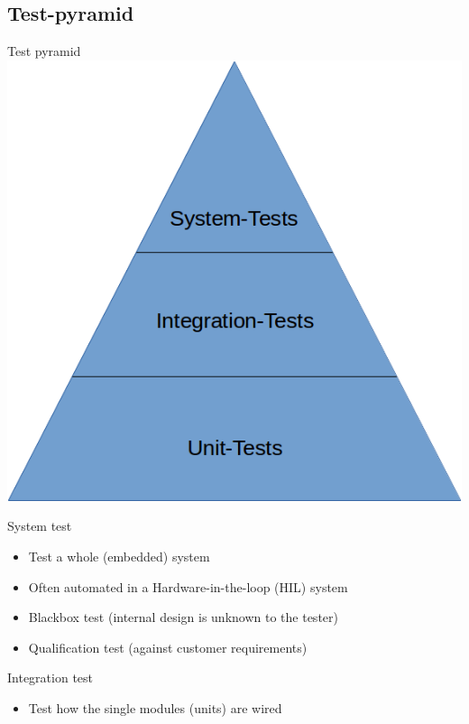 \documentclass{beamer}
\begin{document}
\subsection{Test-pyramid}
\begin{frame}{Test pyramid}
\includegraphics[scale=0.48]{img/TestPyramid.png}
\end{frame}

\begin{frame}{System test}
\begin{itemize}
  \item Test a whole (embedded) system
  \item Often automated in a Hardware-in-the-loop (HIL) system
  \item Blackbox test (internal design is unknown to the tester)
  \item Qualification test (against customer requirements)
\end{itemize}
\end{frame}

\begin{frame}{Integration test}
\begin{itemize}
  \item Test how the single modules (units) are wired
\end{itemize}
\end{frame}
\end{document}
